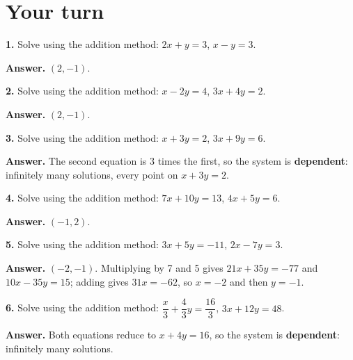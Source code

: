\documentclass{ximera}
\begin{document}
\section*{Your turn}

\begin{problem}

\textbf{1.} Solve using the addition method: $2x+y=3$, $x-y=3$.

\begin{hint}
\textbf{Answer.} $(2,-1)$.
\end{hint}
\end{problem}

\begin{problem}

\textbf{2.} Solve using the addition method: $x-2y=4$, $3x+4y=2$.

\begin{hint}
\textbf{Answer.} $(2,-1)$.
\end{hint}
\end{problem}

\begin{problem}

\textbf{3.} Solve using the addition method: $x+3y=2$, $3x+9y=6$.

\begin{hint}
\textbf{Answer.} The second equation is 3 times the first, so the system is
\textbf{dependent}: infinitely many solutions, every point on $x+3y=2$.
\end{hint}
\end{problem}

\begin{problem}

\textbf{4.} Solve using the addition method: $7x+10y=13$, $4x+5y=6$.

\begin{hint}
\textbf{Answer.} $(-1,2)$.
\end{hint}
\end{problem}

\begin{problem}

\textbf{5.} Solve using the addition method: $3x+5y=-11$, $2x-7y=3$.

\begin{hint}
\textbf{Answer.} $(-2,-1)$. Multiplying by 7 and 5 gives $21x+35y=-77$ and
$10x-35y=15$; adding gives $31x=-62$, so $x=-2$ and then $y=-1$.
\end{hint}
\end{problem}

\begin{problem}

\textbf{6.} Solve using the addition method:
$\dfrac{x}{3}+\dfrac{4}{3}y=\dfrac{16}{3}$, $3x+12y=48$.

\begin{hint}
\textbf{Answer.} Both equations reduce to $x+4y=16$, so the system is \textbf{dependent}:
infinitely many solutions.
\end{hint}
\end{problem}
\end{document}
